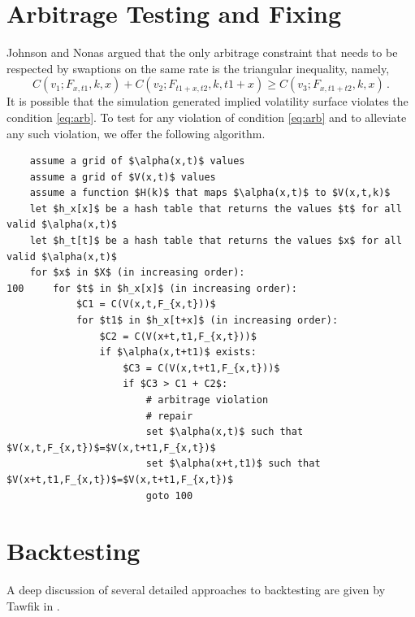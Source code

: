 \documentclass[12pt,oneside]{article}
\newcommand{\beqn}{\begin{equation}}
\newcommand{\eeqn}{\end{equation}}
\numberwithin{equation}{section}
\begin{document}
\section{Arbitrage Testing and Fixing}
Johnson and Nonas \cite{JN} argued that the only arbitrage constraint that needs to be respected
by swaptions on the same rate is the triangular inequality, namely,
\beqn\label{eq:arb}
C(v_1;F_{x,t1},k,x)+C(v_2;F_{t1+x,t2},k,t1+x)\ge C(v_3;F_{x,t1+t2},k,x)\,.
\eeqn
It is possible that the simulation generated implied volatility surface
violates the condition \eqref{eq:arb}.
To test for any violation of condition \eqref{eq:arb} and to alleviate any such violation,
we offer the following algorithm.
\bigskip
\begin{lstlisting}
    assume a grid of $\alpha(x,t)$ values
    assume a grid of $V(x,t)$ values
    assume a function $H(k)$ that maps $\alpha(x,t)$ to $V(x,t,k)$
    let $h_x[x]$ be a hash table that returns the values $t$ for all valid $\alpha(x,t)$
    let $h_t[t]$ be a hash table that returns the values $x$ for all valid $\alpha(x,t)$
    for $x$ in $X$ (in increasing order):
100     for $t$ in $h_x[x]$ (in increasing order):
            $C1 = C(V(x,t,F_{x,t}))$
            for $t1$ in $h_x[t+x]$ (in increasing order):
                $C2 = C(V(x+t,t1,F_{x,t}))$
                if $\alpha(x,t+t1)$ exists:
                    $C3 = C(V(x,t+t1,F_{x,t}))$
                    if $C3 > C1 + C2$:
                        # arbitrage violation
                        # repair
                        set $\alpha(x,t)$ such that $V(x,t,F_{x,t})$=$V(x,t+t1,F_{x,t})$
                        set $\alpha(x+t,t1)$ such that $V(x+t,t1,F_{x,t})$=$V(x,t+t1,F_{x,t})$
                        goto 100
\end{lstlisting}

\section{Backtesting}
A deep discussion of several detailed approaches to backtesting are given by Tawfik in \cite{T}.
\end{document}
